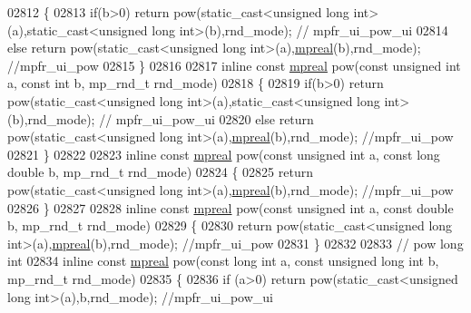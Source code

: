 \begin{DoxyCode}
{{02812 \{
02813     \textcolor{keywordflow}{if}(b>0) \textcolor{keywordflow}{return} pow(static\_cast<unsigned long int>(a),static\_cast<unsigned long int>(b),rnd\_mode); \textcolor{comment}{//
      mpfr\_ui\_pow\_ui}
02814     \textcolor{keywordflow}{else}    \textcolor{keywordflow}{return} pow(static\_cast<unsigned long int>(a),\hyperlink{classmpfr_1_1mpreal}{mpreal}(b),rnd\_mode); \textcolor{comment}{//mpfr\_ui\_pow}
02815 \}
02816 
02817 \textcolor{keyword}{inline} \textcolor{keyword}{const} \hyperlink{classmpfr_1_1mpreal}{mpreal} pow(\textcolor{keyword}{const} \textcolor{keywordtype}{unsigned} \textcolor{keywordtype}{int} a, \textcolor{keyword}{const} \textcolor{keywordtype}{int} b, mp\_rnd\_t rnd\_mode)
02818 \{
02819     \textcolor{keywordflow}{if}(b>0) \textcolor{keywordflow}{return} pow(static\_cast<unsigned long int>(a),static\_cast<unsigned long int>(b),rnd\_mode); \textcolor{comment}{//
      mpfr\_ui\_pow\_ui}
02820     \textcolor{keywordflow}{else}    \textcolor{keywordflow}{return} pow(static\_cast<unsigned long int>(a),\hyperlink{classmpfr_1_1mpreal}{mpreal}(b),rnd\_mode); \textcolor{comment}{//mpfr\_ui\_pow}
02821 \}
02822 
02823 \textcolor{keyword}{inline} \textcolor{keyword}{const} \hyperlink{classmpfr_1_1mpreal}{mpreal} pow(\textcolor{keyword}{const} \textcolor{keywordtype}{unsigned} \textcolor{keywordtype}{int} a, \textcolor{keyword}{const} \textcolor{keywordtype}{long} \textcolor{keywordtype}{double} b, mp\_rnd\_t rnd\_mode)
02824 \{
02825     \textcolor{keywordflow}{return} pow(static\_cast<unsigned long int>(a),\hyperlink{classmpfr_1_1mpreal}{mpreal}(b),rnd\_mode); \textcolor{comment}{//mpfr\_ui\_pow}
02826 \}
02827 
02828 \textcolor{keyword}{inline} \textcolor{keyword}{const} \hyperlink{classmpfr_1_1mpreal}{mpreal} pow(\textcolor{keyword}{const} \textcolor{keywordtype}{unsigned} \textcolor{keywordtype}{int} a, \textcolor{keyword}{const} \textcolor{keywordtype}{double} b, mp\_rnd\_t rnd\_mode)
02829 \{
02830     \textcolor{keywordflow}{return} pow(static\_cast<unsigned long int>(a),\hyperlink{classmpfr_1_1mpreal}{mpreal}(b),rnd\_mode); \textcolor{comment}{//mpfr\_ui\_pow}
02831 \}
02832 
02833 \textcolor{comment}{// pow long int}
02834 \textcolor{keyword}{inline} \textcolor{keyword}{const} \hyperlink{classmpfr_1_1mpreal}{mpreal} pow(\textcolor{keyword}{const} \textcolor{keywordtype}{long} \textcolor{keywordtype}{int} a, \textcolor{keyword}{const} \textcolor{keywordtype}{unsigned} \textcolor{keywordtype}{long} \textcolor{keywordtype}{int} b, mp\_rnd\_t rnd\_mode)
02835 \{
02836     \textcolor{keywordflow}{if} (a>0) \textcolor{keywordflow}{return} pow(static\_cast<unsigned long int>(a),b,rnd\_mode); \textcolor{comment}{//mpfr\_ui\_pow\_ui}
}}
\end{DoxyCode}

